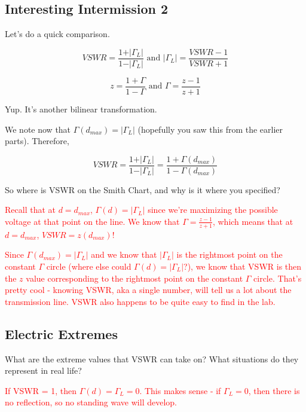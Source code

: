 \documentclass{article}
\begin{document}
\vfill

\subsection{Interesting Intermission 2}

Let's do a quick comparison.

$$VSWR = \frac{1 + \vert \Gamma_L \vert}{1 - \vert \Gamma_L \vert} \text{ and } \vert \Gamma_L \vert = \frac{VSWR - 1}{VSWR + 1}$$

$$z = \frac{1 + \Gamma}{1 - \Gamma} \text{ and } \Gamma = \frac{z - 1}{z + 1}$$

Yup. It's another bilinear transformation.

We note now that $\Gamma(d_{max}) = \vert \Gamma_L \vert$ (hopefully you saw this from the earlier parts). Therefore,

$$VSWR = \frac{1 + \vert \Gamma_L \vert}{1 - \vert \Gamma_L \vert} = \frac{1 + \Gamma(d_{max})}{1 - \Gamma(d_{max})}$$

So where is VSWR on the Smith Chart, and why is it where you specified?

\textcolor{red}{Recall that at $d = d_{max}$, $\Gamma(d) = \vert \Gamma_L \vert$ since we're maximizing the possible voltage at that point on the line. We know that $\Gamma = \frac{z-1}{z+1}$, which means that at $d = d_{max}$, $VSWR = z(d_{max})$!}

\textcolor{red}{Since $\Gamma(d_{max}) = \vert \Gamma_L \vert$ and we know that $\vert \Gamma_L \vert$ is the rightmost point on the constant $\Gamma$ circle (where else could $\Gamma(d) = \vert \Gamma_L \vert$?), we know that VSWR is then the $z$ value corresponding to the rightmost point on the constant $\Gamma$ circle. That's pretty cool - knowing VSWR, aka a single number, will tell us a lot about the transmission line. VSWR also happens to be quite easy to find in the lab.}

\vfill

\subsection{Electric Extremes}

What are the extreme values that VSWR can take on? What situations do they represent in real life?

\textcolor{red}{If VSWR = 1, then $\Gamma(d) = \Gamma_L = 0$. This makes sense - if $\Gamma_L = 0$, then there is no reflection, so no standing wave will develop.}
\end{document}
